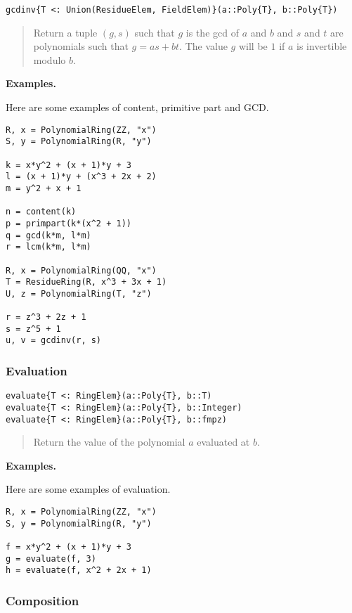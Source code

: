 \documentclass[a4paper,10pt]{article}
\newcommand{\desc}[1]{\vspace{-3mm}\begin{quote}#1\end{quote}}
\begin{document}
\begin{lstlisting}
gcdinv{T <: Union(ResidueElem, FieldElem)}(a::Poly{T}, b::Poly{T})
\end{lstlisting}

\desc{Return a tuple $(g, s)$ such that $g$ is the gcd of $a$ and $b$ and $s$
and $t$ are polynomials such that $g = as + bt$. The value $g$ will be $1$ if
$a$ is invertible modulo $b$.}

\textbf{Examples.}

Here are some examples of content, primitive part and GCD.

\begin{lstlisting}
R, x = PolynomialRing(ZZ, "x")
S, y = PolynomialRing(R, "y")

k = x*y^2 + (x + 1)*y + 3
l = (x + 1)*y + (x^3 + 2x + 2)
m = y^2 + x + 1

n = content(k)
p = primpart(k*(x^2 + 1))
q = gcd(k*m, l*m)
r = lcm(k*m, l*m)

R, x = PolynomialRing(QQ, "x")
T = ResidueRing(R, x^3 + 3x + 1)
U, z = PolynomialRing(T, "z")

r = z^3 + 2z + 1
s = z^5 + 1
u, v = gcdinv(r, s)
\end{lstlisting}

\subsubsection{Evaluation}

\begin{lstlisting}
evaluate{T <: RingElem}(a::Poly{T}, b::T)
evaluate{T <: RingElem}(a::Poly{T}, b::Integer)
evaluate{T <: RingElem}(a::Poly{T}, b::fmpz)
\end{lstlisting}

\desc{Return the value of the polynomial $a$ evaluated at $b$.}

\textbf{Examples.}

Here are some examples of evaluation.

\begin{lstlisting}
R, x = PolynomialRing(ZZ, "x")
S, y = PolynomialRing(R, "y")

f = x*y^2 + (x + 1)*y + 3
g = evaluate(f, 3)
h = evaluate(f, x^2 + 2x + 1)
\end{lstlisting}

\subsubsection{Composition}
\end{document}
